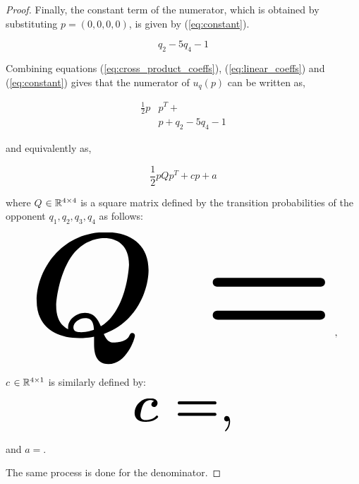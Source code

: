 \begin{proof}
Finally, the constant term of the numerator, which is obtained by substituting
$p=(0, 0, 0, 0)$, is given by (\ref{eq:constant}).

\begin{equation}\label{eq:constant}
q_{2} - 5 q_{4} - 1
\end{equation}

Combining equations (\ref{eq:cross_product_coeffs}), (\ref{eq:linear_coeffs}) and (\ref{eq:constant})
gives that the numerator of \(u_q(p)\) can be written as,

\begingroup
\tiny\boldmath
\begin{align*}
    \frac{1}{2}p &  p^T +  \\
    &  p + q_{2} - 5 q_{4} - 1
\end{align*}
\endgroup

and equivalently as,

\[\frac{1}{2}pQp^T + cp + a\]

where \(Q\) \(\in \mathbb{R}^{4\times4}\) is a square matrix defined by the
transition probabilities of the opponent \(q_1, q_2, q_3, q_4\) as follows:

\begin{equation*}
    \resizebox{0.9\linewidth}{!}{\arraycolsep=2.5pt%
    \boldmath\(
    Q = \)},
\end{equation*}

\(c\) \(\in \mathbb{R}^{4 \times 1}\) is similarly defined by:

\begin{equation*}
    \resizebox{0.3\linewidth}{!}{\arraycolsep=2.5pt%
    \boldmath\(c = \),}
\end{equation*}

and \(a = \).

The same process is done for the denominator.
\end{proof}
